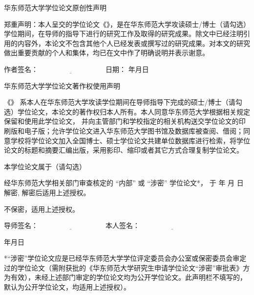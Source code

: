 \newpage
\thispagestyle{empty}

\vspace*{1em}

{
\linespread{1.4}
\centerline{\STSong 华东师范大学学位论文原创性声明}

\bigskip

郑重声明：本人呈交的学位论文《\cctitle》，是在华东师范大学攻读硕士/博士（请勾选）学位期间，在导师的指导下进行的研究工作及取得的研究成果。除文中已经注明引用的内容外，本论文不包含其他个人已经发表或撰写过的研究成果。对本文的研究做出重要贡献的个人和集体，均已在文中作了明确说明并表示谢意。

\vspace{1em}


{\STSong 作者签名}：$\underline{\hspace{4cm}}$ \hfill
{\STSong 日\quad 期}： \makebox[1.5cm][c]{}年\makebox[1cm][c]{}月\makebox[1cm][c]{}日

\vspace{4em}

\centerline{\STSong 华东师范大学学位论文著作权使用声明}
\bigskip


《\cctitle》
系本人在华东师范大学攻读学位期间在导师指导下完成的硕士/博士（请勾选）学位论文，本论文的著作权归本人所有。本人同意华东师范大学根据相关规定保留和使用此学位论文，
并向主管部门和学校指定的相关机构送交学位论文的印刷版和电子版；允许学位论文进入华东师范大学图书馆及数据库被查阅、借阅；同意学校将学位论文加入全国博士、硕士学位论文共建单位数据库进行检索，将学位论文的标题和摘要汇编出版，采用影印、缩印或者其它方式合理复制学位论文。

本学位论文属于（请勾选）
\begin{compactenum}
\item 经华东师范大学相关部门审查核定的 “内部” 或 “涉密” 学位论文*，
  于 \makebox[1cm][c]{} 年 \makebox[1cm][c]{} 月 \makebox[1cm][c]{} 日解密, 解密后适用上述授权。
\item 不保密，适用上述授权。
\end{compactenum}

\bigskip

{\STSong 导师签名}：$\underline{\hspace{4cm}}$ \hfill
{\STSong 本人签名}：$\underline{\hspace{4cm}}$

\bigskip

{\hfill\makebox[1.5cm][c]{}年\makebox[1cm][c]{}月\makebox[1cm][c]{}日}

\vfill

\parbox[t]{0.946\textwidth}{
*“涉密”学位论文应是已经华东师范大学学位评定委员会办公室或保密委员会审定过的学位论文（需附获批的《华东师范大学研究生申请学位论文“涉密”审批表》方为有效），未经上述部门审定的学位论文均为公开学位论文。此声明栏不填写的，默认为公开学位论文，均适用上述授权）。
}
}
